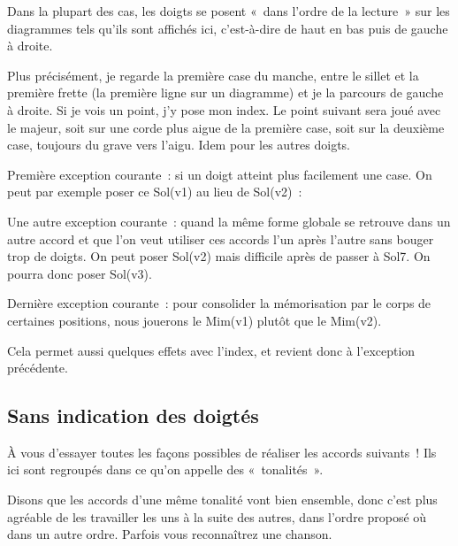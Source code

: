 \documentclass[11pt]{article}
\begin{document}
Dans la plupart des cas, les doigts se posent «~dans l’ordre de la lecture~»
sur les diagrammes tels qu’ils sont affichés ici, c’est-à-dire de haut en bas
puis de gauche à droite. 


Plus précisément, je regarde la première case du manche, entre le sillet
et la première frette (la première ligne sur un
diagramme) et je la parcours de gauche à droite. Si je vois un point,
j’y pose mon index. Le point suivant sera joué avec le majeur, soit
sur une corde plus aigue de la première case, soit sur la deuxième case,
toujours du grave vers l’aigu. Idem pour les autres doigts.

Première exception courante~: si un doigt atteint plus facilement une case.
On peut par exemple poser ce Sol(v1) au lieu de Sol(v2)~:


Une autre exception courante~: quand la même forme globale se retrouve dans un
autre accord et que l’on veut utiliser ces accords l’un après l’autre sans
bouger trop de doigts. On peut poser Sol(v2) mais difficile après de passer à
Sol7. On pourra donc poser Sol(v3).


Dernière exception courante~: pour consolider la mémorisation par le corps de
certaines positions, nous jouerons le Mim(v1) plutôt que le Mim(v2).


Cela permet aussi quelques effets avec l’index, et revient donc à l’exception
précédente.

\subsection{Sans indication des doigtés}

À vous d’essayer toutes les façons possibles de réaliser les accords
suivants~! Ils ici sont regroupés dans ce qu’on appelle des «~tonalités~».

Disons que les accords d’une même tonalité vont bien ensemble, donc
c’est plus agréable de les travailler les uns à la suite des autres, dans
l’ordre proposé où dans un autre ordre. Parfois vous reconnaîtrez une chanson.
\end{document}
